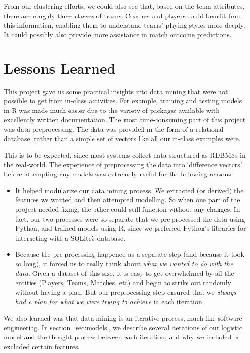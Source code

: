 \documentclass[11pt]{article}
\begin{document}
From our clustering efforts, we could also see that, based on the team attributes, there are roughly three classes of teams.
Coaches and players could benefit from this information, enabling them to understand teams' playing styles more deeply.
It could possibly also provide more assistance in match outcome predictions.

\section{Lessons Learned}
This project gave us some practical insights into data mining that were not possible to get from in-class activities.
For example, training and testing models in R was made much easier due to the variety of packages available with excellently written documentation.
The most time-consuming part of this project was data-preprocessing.
The data was provided in the form of a relational database, rather than a simple set of vectors like all our in-class examples were.

This is to be expected, since most systems collect data structured as RDBMSs in the real-world.
The experience of preprocessing the data into `difference vectors' before attempting any models was extremely useful for the following reasons:
\begin{itemize}
  \item It helped modularize our data mining process. We extracted (or derived) the features we wanted and then attempted modelling.
  So when one part of the project needed fixing, the other could still function without any changes.
  In fact, our two processes were so separate that we pre-processed the data using Python, and trained models using R, since we preferred Python's libraries for interacting with a SQLite3 database.
  \item Because the pre-processing happened as a separate step (and because it took so long), it forced us to really think about \textit{what we wanted to do with the data}.
  Given a dataset of this size, it is easy to get overwhelmed by all the entities (Players, Teams, Matches, etc) and begin to strike out randomly without having a plan.
  But our preprocessing step ensured that we \textit{always had a plan for what we were trying to achieve} in each iteration.
\end{itemize}

We also learned was that data mining is an iterative process, much like software engineering.
In section~\ref{sec:models}, we describe several iterations of our logistic model and the thought process between each iteration, and why we included or excluded certain features.
\end{document}
